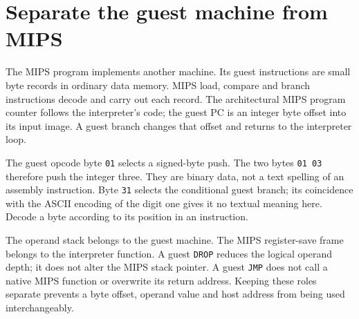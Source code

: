 \section{Separate the guest machine from MIPS}\label{vm-machines}
The MIPS program implements another machine. Its guest instructions are small byte
records in ordinary data memory. MIPS load, compare and branch instructions decode
and carry out each record. The architectural MIPS program counter follows the
interpreter's code; the guest PC is an integer byte offset into its input image.
A guest branch changes that offset and returns to the interpreter loop.

The guest opcode byte \texttt{01} selects a signed-byte push. The two bytes
\texttt{01 03} therefore push the integer three. They are binary data, not a text
spelling of an assembly instruction. Byte \texttt{31} selects the conditional guest
branch; its coincidence with the ASCII encoding of the digit one gives it no textual
meaning here. Decode a byte according to its position in an instruction.

The operand stack belongs to the guest machine. The MIPS register-save frame belongs
to the interpreter function. A guest \texttt{DROP} reduces the logical operand depth;
it does not alter the MIPS stack pointer. A guest \texttt{JMP} does not call a native
MIPS function or overwrite its return address. Keeping these roles separate prevents
a byte offset, operand value and host address from being used interchangeably.
